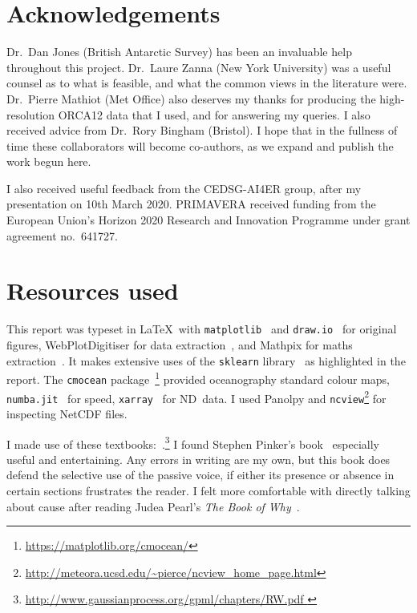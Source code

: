 \section{Acknowledgements}
Dr.\ Dan Jones (British Antarctic Survey)
has been an invaluable help throughout this project.
Dr.\ Laure Zanna (New York University)
 was a useful counsel as to what is feasible,
 and what the common views in the literature were.
Dr.\ Pierre Mathiot (Met Office) also deserves my thanks for
producing the high-resolution ORCA12 data that I used, and
for answering my queries.
I also received advice from Dr.\ Rory Bingham (Bristol).
I hope that in the fullness of time these collaborators will become
co-authors, as we expand and publish the work begun here.

I also received useful feedback from the CEDSG-AI4ER group,
after my presentation on 10th March 2020.
PRIMAVERA received funding from the European Union's Horizon 2020
Research and Innovation Programme under grant agreement no.~641727.


\section{Resources used}

This report was typeset in \LaTeX\
with \texttt{matplotlib}~\cite{Hunter:2007} and \texttt{draw.io}~\cite{DrawIO}
for original figures, WebPlotDigitiser for data extraction~\cite{WebPlotDigitiser},
and Mathpix for maths extraction~\cite{mathpix}.
It makes extensive uses of the \texttt{sklearn} library~\cite{scikit-learn} as highlighted in the report.
The \texttt{cmocean} package~\cite{thyng2016true}\footnote{\url{https://matplotlib.org/cmocean/}}
provided oceanography standard colour maps, \texttt{numba.jit}~\cite{lam2015numba} for speed,
\texttt{xarray}~\cite{hoyer2017xarray} for ND~data.
I used Panolpy and \texttt{ncview}\footnote{\url{http://meteora.ucsd.edu/~pierce/ncview_home_page.html}}
for inspecting NetCDF files.

I made use of these textbooks:~\cite{roisin2010GFD,williams2011ocean,ITILA,
sivia2006data,williams2006gaussian,
}.\footnote{\url{http://www.gaussianprocess.org/gpml/chapters/RW.pdf
}}
I found Stephen Pinker's book~\cite{pinker2015sense} especially useful and entertaining.
Any errors in writing are my own, but this book does defend the selective use of the
passive voice, if either its presence or absence in certain sections frustrates the reader.
I felt more comfortable with directly talking about cause after reading
Judea Pearl's \textit{The Book of Why}~\cite{pearl2018book}.

